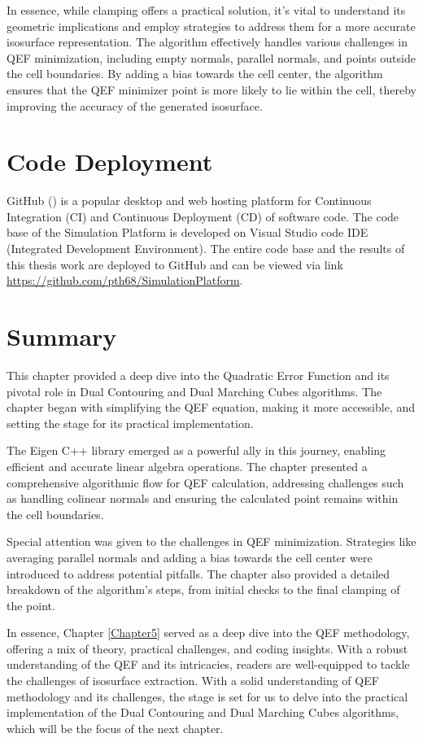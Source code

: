 \noindent In essence, while clamping offers a practical solution, it's vital to understand its geometric implications and employ strategies to address them for a more accurate isosurface representation. The algorithm effectively handles various challenges in QEF minimization, including empty normals, parallel normals, and points outside the cell boundaries. By adding a bias towards the cell center, the algorithm ensures that the QEF minimizer point is more likely to lie within the cell, thereby improving the accuracy of the generated isosurface.

\section{Code Deployment} 
GitHub (\cite{github}) is a popular desktop and web hosting platform for Continuous Integration (CI) and Continuous Deployment (CD) of software code. The code base of the Simulation Platform is developed on Visual Studio code IDE (Integrated Development Environment). The entire code base and the results of this thesis work are deployed to GitHub and can be viewed via link \url{https://github.com/pth68/SimulationPlatform}.

\section{Summary}
This chapter provided a deep dive into the Quadratic Error Function and its pivotal role in Dual Contouring and Dual Marching Cubes algorithms. The chapter began with simplifying the QEF equation, making it more accessible, and setting the stage for its practical implementation.

The Eigen C++ library emerged as a powerful ally in this journey, enabling efficient and accurate linear algebra operations. The chapter presented a comprehensive algorithmic flow for QEF calculation, addressing challenges such as handling colinear normals and ensuring the calculated point remains within the cell boundaries.

Special attention was given to the challenges in QEF minimization. Strategies like averaging parallel normals and adding a bias towards the cell center were introduced to address potential pitfalls. The chapter also provided a detailed breakdown of the algorithm's steps, from initial checks to the final clamping of the point.

In essence, Chapter \ref{Chapter5} served as a deep dive into the QEF methodology, offering a mix of theory, practical challenges, and coding insights. With a robust understanding of the QEF and its intricacies, readers are well-equipped to tackle the challenges of isosurface extraction. With a solid understanding of QEF methodology and its challenges, the stage is set for us to delve into the practical implementation of the Dual Contouring and Dual Marching Cubes algorithms, which will be the focus of the next chapter.

